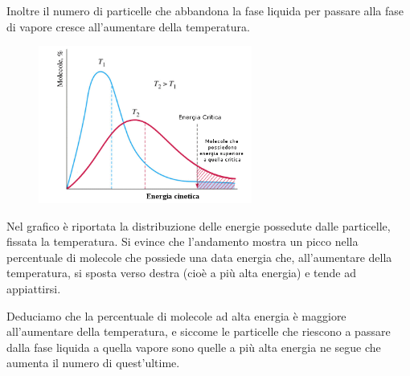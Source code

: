 Inoltre il numero di particelle che abbandona la fase liquida per passare alla fase di vapore cresce all'aumentare della temperatura.

\begin{minipage}{0.45\textwidth}
    \begin{figure}[H]
        \centering
        \includegraphics[width=7cm]{immagini/energie_fase_liquida.png}
    \end{figure}
\end{minipage}
\begin{minipage}{0.54\textwidth}
\vspace{0.5cm}Nel grafico è riportata la distribuzione delle energie possedute dalle particelle, fissata la temperatura. Si evince che l'andamento mostra un picco nella percentuale di molecole che possiede una data energia che, all'aumentare della temperatura, si sposta verso destra (cioè a più alta energia) e tende ad appiattirsi.
\end{minipage}

Deduciamo che la percentuale di molecole ad alta energia è maggiore all'aumentare della temperatura, e siccome le particelle che riescono a passare dalla fase liquida a quella vapore sono quelle a più alta energia ne segue che aumenta il numero di quest'ultime.

